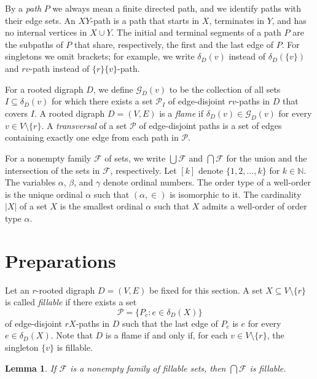 \documentclass[12pt,a4paper]{amsart}
\theoremstyle{plain}
\newtheorem{lemma}[theorem]{Lemma}
\theoremstyle{definition}
\begin{document}
By a \emph{path} $P$ we always mean a finite directed path, and we identify paths with their edge sets.
An $XY$-path is a path that starts in $X$, terminates in $Y$, and has no internal vertices in $X\cup Y$.
The initial and terminal segments of a path $P$ are the subpaths of $P$ that share, respectively, the first and the last edge of $P$.
For singletons we omit brackets; for example, we write $\delta_D(v)$ instead of $\delta_D(\{v\})$ and $rv$-path instead of $\{r\}\{v\}$-path.

For a rooted digraph $D$, we define $\mathcal{G}_D(v)$ to be the collection of all sets $I\subseteq\delta_D(v)$ for which there exists a set 
$\mathcal{P}_I$ of edge-disjoint $rv$-paths in $D$ that covers $I$.
A rooted digraph $D=(V,E)$ is a \emph{flame} if $\delta_D(v)\in\mathcal{G}_D(v)$ for every $v\in V\setminus\{r\}$.
A \emph{transversal} of a set $\mathcal{P}$ of edge-disjoint paths is a set of edges containing exactly one edge from each path in $\mathcal{P}$.

For a nonempty family $\mathcal{F}$ of sets, we write $\bigcup\mathcal{F}$ and $\bigcap\mathcal{F}$ for the union and the intersection of the 
sets in $\mathcal{F}$, respectively. Let $[k]$ denote $\{ 1,2,\dots, k \}$ for $k\in \mathbb{N}$.
The variables $\alpha$, $\beta$, and $\gamma$ denote ordinal numbers.
The order type of a well-order is the unique ordinal $\alpha$ such that $(\alpha,\in)$ is isomorphic to it.
The cardinality $\lvert X\rvert$ of a set $X$ is the smallest ordinal $\alpha$ such that $X$ admits a well-order of order type $\alpha$.

 


\section{Preparations}\label{sec: prep}

Let an $r$-rooted digraph $D=(V,E)$ be fixed for this section.
A set $X\subseteq V\setminus\{r\}$ is called \emph{fillable} if there exists a set
\[
\mathcal{P}=\{P_e : e\in\delta_D(X)\}
\]
of edge-disjoint $rX$-paths in $D$ such that the last edge of $P_e$ is $e$ for every $e\in\delta_D(X)$.
Note that $D$ is a flame if and only if, for each $v\in V\setminus\{r\}$, the singleton $\{v\}$ is fillable.

\begin{lemma}\label{lem: intersection of fillable}
If $\mathcal{F}$ is a nonempty family of fillable sets, then $\bigcap\mathcal{F}$ is fillable.
\end{lemma}
\end{document}
